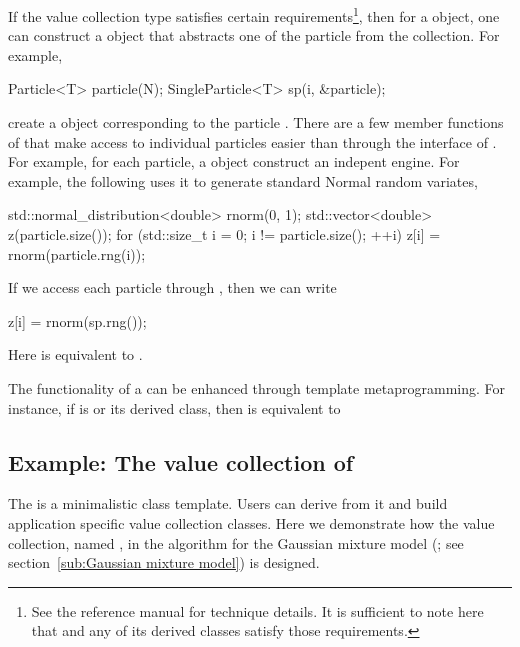 If the value collection type  satisfies certain
requirements\footnote{See the reference manual for technique details. It is
  sufficient to note here that  and any of its derived
  classes satisfy those requirements.}, then for a 
object, one can construct a  object that
abstracts one of the particle from the collection. For example,
\begin{cppcode}
Particle<T> particle(N);
SingleParticle<T> sp(i, &particle);
\end{cppcode}
create a  object corresponding to the particle
. There are a few member functions of
 that make access to individual particles easier
than through the interface of . For example, for each
particle, a  object construct an indepent \cppoo{} \rng
engine. For example, the following uses it to generate standard Normal random
variates,
\begin{cppcode}
std::normal_distribution<double> rnorm(0, 1);
std::vector<double> z(particle.size());
for (std::size_t i = 0; i != particle.size(); ++i)
    z[i] = rnorm(particle.rng(i));
\end{cppcode}
If we access each particle through , then we can
write
\begin{cppcode}
z[i] = rnorm(sp.rng());
\end{cppcode}
Here  is equivalent to .

The functionality of a  can be enhanced through
template metaprogramming. For instance, if  is
 or its derived class, then  is
equivalent to 

\subsection{Example: The value collection of \protect\gmm}
\label{sub:Example: The value collection of gmm}

The  is a minimalistic class template. Users can derive
from it and build application specific value collection classes. Here we
demonstrate how the value collection, named , in the \smc[2]
algorithm for the Gaussian mixture model (\gmm; see section~\ref{sub:Gaussian
  mixture model}) is designed.

